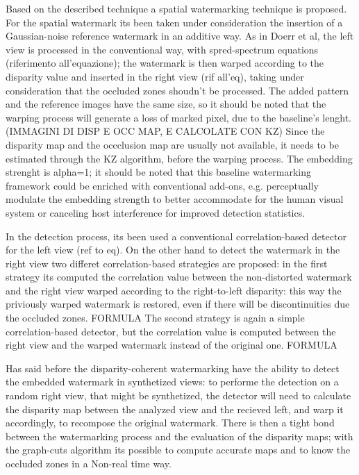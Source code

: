 Based on the described technique a spatial watermarking technique is proposed.
For the spatial watermark its been taken under consideration the insertion of a Gaussian-noise reference watermark in an additive way.
As in Doerr et al, the left view is processed in the conventional way, with spred-spectrum equations (riferimento all'equazione); the watermark is then warped according to the disparity value and inserted in the right view (rif all'eq), taking under consideration that the occluded zones shoudn't be processed.
 The added pattern and the reference images have the same size, so it should be noted that the warping process will generate a loss of marked pixel, due to the baseline's lenght.
(IMMAGINI DI DISP E OCC MAP, E CALCOLATE CON KZ)
Since the disparity map and the occclusion map are usually not available, it needs to be estimated through the KZ algorithm, before the warping process.
The embedding strenght is alpha=1; it should be noted that this baseline watermarking framework could be enriched with conventional add-ons, e.g. perceptually modulate the embedding strength to better accommodate
for the human visual system or canceling host interference for improved detection statistics.

In the detection process, its been used a conventional correlation-based detector for the left view (ref to eq). 
On the other hand to detect the watermark in the right view two differet correlation-based strategies are proposed:
in the first strategy its computed the correlation value between the non-distorted watermark and the right view warped according to the right-to-left disparity: this way the priviously warped watermark is restored, even if there will be discontinuities due the occluded zones.
FORMULA
The second strategy is again a simple correlation-based detector, but the correlation value is computed between the right view and the warped watermark instead of the original one.
FORMULA  

Has said before the disparity-coherent watermarking have the ability to detect the embedded watermark in synthetized views: to performe the detection on a random right view, that might be synthetized, the detector will need to calculate the disparity map between the analyzed view and the recieved left, and warp it accordingly, to recompose the original watermark. 
There is then a tight bond between the watermarking process and the evaluation of the disparity maps; with the graph-cuts algorithm its possible to compute accurate maps and to know the occluded zones in a Non-real time way. 
